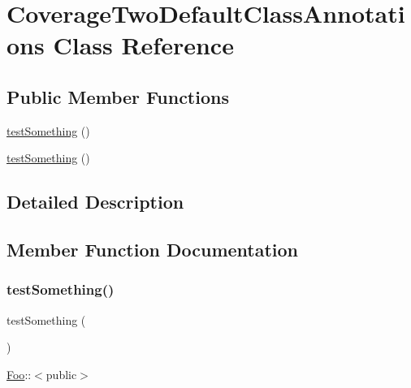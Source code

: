 \hypertarget{class_coverage_two_default_class_annotations}{}\section{Coverage\+Two\+Default\+Class\+Annotations Class Reference}
\label{class_coverage_two_default_class_annotations}
\subsection*{Public Member Functions}
\begin{DoxyCompactItemize}
\item 
\mbox{\hyperlink{class_coverage_two_default_class_annotations_a0fc4e17369bc9607ebdd850d9eda8167}{test\+Something}} ()
\item 
\mbox{\hyperlink{class_coverage_two_default_class_annotations_a0fc4e17369bc9607ebdd850d9eda8167}{test\+Something}} ()
\end{DoxyCompactItemize}


\subsection{Detailed Description}


\subsection{Member Function Documentation}
\mbox{\label{class_coverage_two_default_class_annotations_a0fc4e17369bc9607ebdd850d9eda8167}} 
\subsubsection{\texorpdfstring{test\+Something()}{testSomething()}\hspace{0.1cm}{\footnotesize\ttfamily [1/2]}}
{\footnotesize\ttfamily test\+Something (\begin{DoxyParamCaption}{ }\end{DoxyParamCaption})}

\mbox{\hyperlink{class_foo}{Foo}}\+:\+:$<$public$>$ \mbox{\label{class_coverage_two_default_class_annotations_a0fc4e17369bc9607ebdd850d9eda8167}} 
